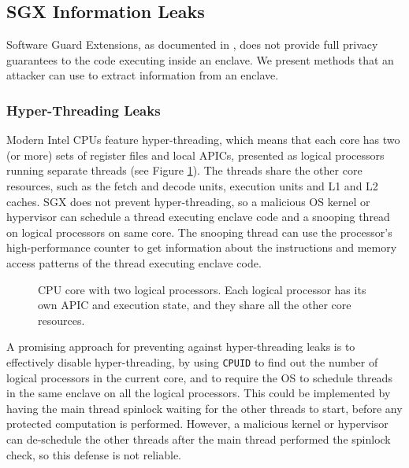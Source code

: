 \subsection{SGX Information Leaks}
\label{sec:sgx_leaks}

Software Guard Extensions, as documented in \cite{intel2013sgxmanual}, does not
provide full privacy guarantees to the code executing inside an enclave. We
present methods that an attacker can use to extract information from an
enclave.

\subsubsection{Hyper-Threading Leaks}

Modern Intel CPUs feature hyper-threading, which means that each core has two
(or more) sets of register files and local APICs, presented as logical
processors running separate threads (see Figure \ref{fig:cpu_core}). The
threads share the other core resources, such as the fetch and decode units,
execution units and L1 and L2 caches. SGX does not prevent hyper-threading, so
a malicious OS kernel or hypervisor can schedule a thread executing enclave
code and a snooping thread on logical processors on same core. The snooping
thread can use the processor's high-performance counter
\cite{petters1999making} to get information about the instructions and memory
access patterns of the thread executing enclave code.

\begin{figure}[hbtp]
  \caption{
    CPU core with two logical processors. Each logical processor has its own
    APIC and execution state, and they share all the other core resources.
  }
  \label{fig:cpu_core}
\end{figure}

A promising approach for preventing against hyper-threading leaks is to
effectively disable hyper-threading, by using \texttt{CPUID} to find out the
number of logical processors in the current core, and to require the OS to
schedule threads in the same enclave on all the logical processors. This could
be implemented by having the main thread spinlock waiting for the other threads
to start, before any protected computation is performed. However, a malicious
kernel or hypervisor can de-schedule the other threads after the main thread
performed the spinlock check, so this defense is not reliable.

